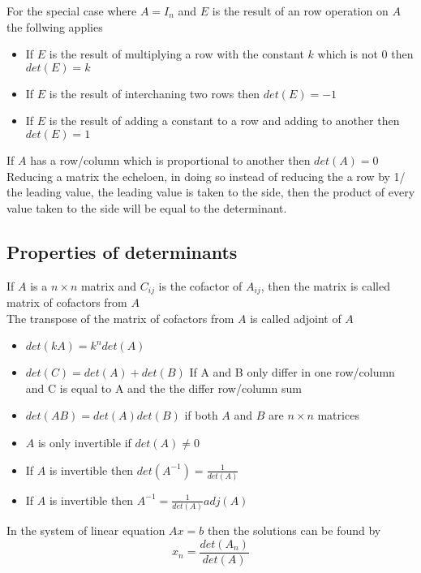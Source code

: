 \documentclass[12pt, a4paper]{article}
\begin{document}
			For the special case where $A=I_n$ and $E$ is the result of an row operation on $A$ the follwing applies
			\begin{itemize}
				\item If $E$ is the result of multiplying a row with the constant $k$ which is not 0 then $det(E)=k$
				\item If $E$ is the result of interchaning two rows then $det(E)=-1$
				\item If $E$ is the result of adding a constant to a row and adding to another then $det(E)=1$
			\end{itemize}
			If $A$ has a row/column which is proportional to another then $det(A)=0$\\
			Reducing a matrix the echeloen, in doing so instead of reducing the a row by 1/ the leading value, the leading value is taken to the side, then the product of every value taken to the side will be equal to the determinant.\\
		\subsection{Properties of determinants}
			If $A$ is a $n\times n$ matrix and $C_{ij}$ is the cofactor of $A_{ij}$, then the matrix is called matrix of cofactors from $A$\\
			The transpose of the matrix of cofactors from $A$ is called adjoint of $A$
			\begin{itemize}
				\item $det(kA)=k^ndet(A)$
				\item $det(C)=det(A)+det(B)$  If A and B only differ in one row/column and C is equal to A and the the differ row/column sum
				\item $det(AB)=det(A)det(B)$ if both $A$ and $B$ are $n\times n$ matrices
				\item $A$ is only invertible if $det(A)\neq 0$
				\item If $A$ is invertible then $det(A^{-1})=\frac{1}{det(A)}$
				\item If $A$ is invertible then $A^{-1}=\frac{1}{det(A)}adj(A)$
			\end{itemize}
			In the system of linear equation $Ax=b$ then the solutions can be found by
			$$x_n=\frac{det(A_n)}{det(A)}$$
\end{document}
